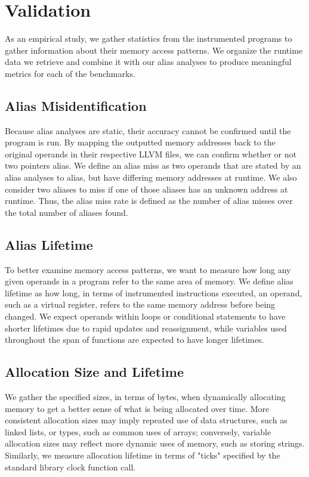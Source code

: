 \chapter{Validation}

As an empirical study, we gather statistics from the instrumented programs to gather information about their memory access patterns. We organize the runtime data we retrieve and combine it with our alias analyses to produce meaningful metrics for each of the benchmarks.

\section{Alias Misidentification}
Because alias analyses are static, their accuracy cannot be confirmed until the program is run. By mapping the outputted memory addresses back to the original operands in their respective LLVM files, we can confirm whether or not two pointers alias. We define an alias miss as two operands that are stated by an alias analyses to alias, but have differing memory addresses at runtime. We also consider two aliases to miss if one of those aliases has an unknown address at runtime. Thus, the alias miss rate is defined as the number of alias misses over the total number of aliases found.

\section{Alias Lifetime}
To better examine memory access patterns, we want to measure how long any given operands in a program refer to the same area of memory. We define alias lifetime as how long, in terms of instrumented instructions executed, an operand, such as a virtual register, refers to the same memory address before being changed. We expect operands within loops or conditional statements to have shorter lifetimes due to rapid updates and reassignment, while variables used throughout the span of functions are expected to have longer lifetimes.

\section{Allocation Size and Lifetime}
We gather the specified sizes, in terms of bytes, when dynamically allocating memory to get a better sense of what is being allocated over time. More consistent allocation sizes may imply repeated use of data structures, such as linked lists, or types, such as common uses of arrays; conversely, variable allocation sizes may reflect more dynamic uses of memory, such as storing strings. Similarly, we measure allocation lifetime in terms of "ticks" specified by the standard library clock function call.
